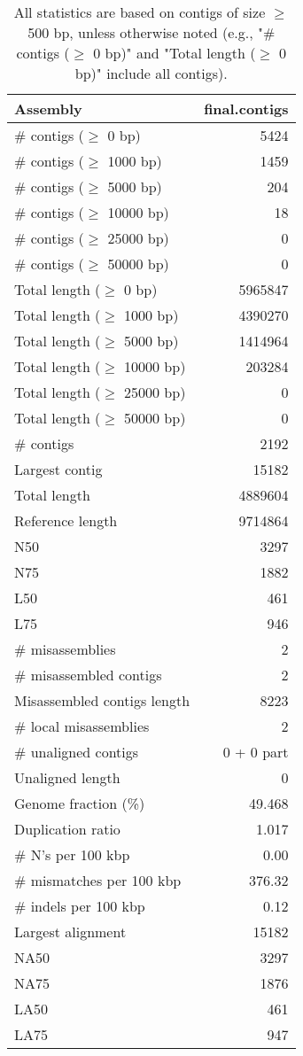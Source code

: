 \documentclass[12pt,a4paper]{article}
\begin{document}
\begin{table}[ht]
\begin{center}
\caption{All statistics are based on contigs of size $\geq$ 500 bp, unless otherwise noted (e.g., "\# contigs ($\geq$ 0 bp)" and "Total length ($\geq$ 0 bp)" include all contigs).}
\begin{tabular}{|l*{1}{|r}|}
\hline
Assembly & final.contigs \\ \hline
\# contigs ($\geq$ 0 bp) & 5424 \\ \hline
\# contigs ($\geq$ 1000 bp) & 1459 \\ \hline
\# contigs ($\geq$ 5000 bp) & 204 \\ \hline
\# contigs ($\geq$ 10000 bp) & 18 \\ \hline
\# contigs ($\geq$ 25000 bp) & 0 \\ \hline
\# contigs ($\geq$ 50000 bp) & 0 \\ \hline
Total length ($\geq$ 0 bp) & 5965847 \\ \hline
Total length ($\geq$ 1000 bp) & 4390270 \\ \hline
Total length ($\geq$ 5000 bp) & 1414964 \\ \hline
Total length ($\geq$ 10000 bp) & 203284 \\ \hline
Total length ($\geq$ 25000 bp) & 0 \\ \hline
Total length ($\geq$ 50000 bp) & 0 \\ \hline
\# contigs & 2192 \\ \hline
Largest contig & 15182 \\ \hline
Total length & 4889604 \\ \hline
Reference length & 9714864 \\ \hline
N50 & 3297 \\ \hline
N75 & 1882 \\ \hline
L50 & 461 \\ \hline
L75 & 946 \\ \hline
\# misassemblies & 2 \\ \hline
\# misassembled contigs & 2 \\ \hline
Misassembled contigs length & 8223 \\ \hline
\# local misassemblies & 2 \\ \hline
\# unaligned contigs & 0 + 0 part \\ \hline
Unaligned length & 0 \\ \hline
Genome fraction (\%) & 49.468 \\ \hline
Duplication ratio & 1.017 \\ \hline
\# N's per 100 kbp & 0.00 \\ \hline
\# mismatches per 100 kbp & 376.32 \\ \hline
\# indels per 100 kbp & 0.12 \\ \hline
Largest alignment & 15182 \\ \hline
NA50 & 3297 \\ \hline
NA75 & 1876 \\ \hline
LA50 & 461 \\ \hline
LA75 & 947 \\ \hline
\end{tabular}
\end{center}
\end{table}
\end{document}

